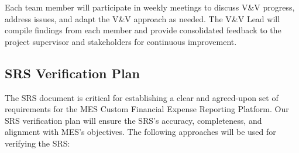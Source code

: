 \documentclass[12pt, titlepage]{article}
\begin{document}
Each team member will participate in weekly meetings to discuss V\&V progress, address issues, and adapt the V\&V approach as needed. The V\&V Lead will compile findings from each member and provide consolidated feedback to the project supervisor and stakeholders for continuous improvement.

\subsection{SRS Verification Plan}
The SRS document is critical for establishing a clear and agreed-upon set of requirements for the MES Custom Financial Expense Reporting Platform. Our SRS verification plan will ensure the SRS’s accuracy, completeness, and alignment with MES’s objectives. The following approaches will be used for verifying the SRS:
\end{document}
